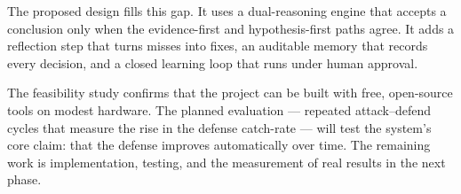 The proposed design fills this gap. It uses a dual-reasoning engine that accepts
a conclusion only when the evidence-first and hypothesis-first paths agree. It
adds a reflection step that turns misses into fixes, an auditable memory that
records every decision, and a closed learning loop that runs under human
approval.

The feasibility study confirms that the project can be built with free,
open-source tools on modest hardware. The planned evaluation --- repeated
attack--defend cycles that measure the rise in the defense catch-rate --- will
test the system's core claim: that the defense improves automatically over time.
The remaining work is implementation, testing, and the measurement of real
results in the next phase.

